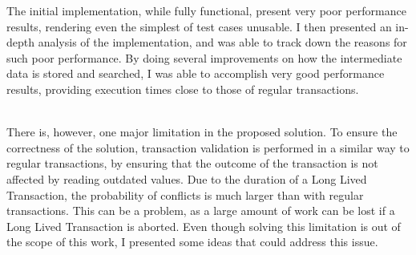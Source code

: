 The initial implementation, while fully functional, present very poor
performance results, rendering even the simplest of test cases
unusable. I then presented an in-depth analysis of the implementation,
and was able to track down the reasons for such poor performance. By
doing several improvements on how the intermediate data is stored and
searched, I was able to accomplish very good performance results,
providing execution times close to those of regular transactions.

~\\

There is, however, one major limitation in the proposed solution. To
ensure the correctness of the solution, transaction validation is
performed in a similar way to regular transactions, by ensuring that
the outcome of the transaction is not affected by reading outdated
values. Due to the duration of a Long Lived Transaction, the
probability of conflicts is much larger than with regular
transactions. This can be a problem, as a large amount of work can be
lost if a Long Lived Transaction is aborted. Even though solving this
limitation is out of the scope of this work, I presented some ideas
that could address this issue.